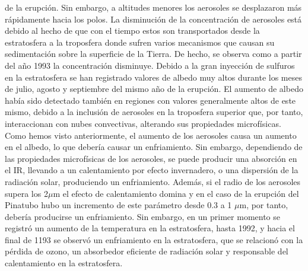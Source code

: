 \documentclass[a4apaper,twocolumn,10pt]{article}
\begin{document}
de la erupci\'on. Sin embargo, a altitudes menores los aerosoles se desplazaron m\'as r\'apidamente hacia los polos. La disminuci\'on de la concentraci\'on de aerosoles est\'a debido al hecho de que con el tiempo estos son transportados desde la estratosfera a la troposfera donde sufren varios mecanismos que causan su sedimentaci\'on sobre la superficie de la Tierra. De hecho, se observa como a partir del a\~no 1993 la concentraci\'on disminuye. Debido a la gran inyecci\'on de sulfuros en la estratosfera se han registrado valores de albedo muy altos durante los meses de julio, agosto y septiembre del mismo a\~no de la erupci\'on.
El aumento de albedo hab\'ia sido detectado tambi\'en en regiones con valores generalmente altos de este mismo, debido a la inclusi\'on de aerosoles en la troposfera superior que, por tanto, interaccionan con nubes convectivas, alterando sus propiedades microf\'isicas. Como hemos visto
anteriormente, el aumento de los aerosoles causa un aumento en el albedo, lo que deber\'ia causar un enfriamiento. Sin embargo, dependiendo de las propiedades microf\'isicas de los aerosoles, se puede producir una absorción en el IR, llevando a un calentamiento por efecto invernadero, o una dispersi\'on de la radiaci\'on solar, produciendo un enfriamiento. Adem\'as, si el
radio de los aerosoles supera los 2$\mu$m el efecto de calentamiento domina y en el caso de la erupci\'on del Pinatubo hubo un incremento de este par\'ametro desde 0.3 a 1 $\mu$m, por tanto, deber\'ia producirse un enfriamiento. Sin embargo, en un primer momento se registr\'o un aumento de la temperatura en la estratosfera, hasta 1992, y hacia el final de 1193 se observ\'o
un enfriamiento en la estratosfera, que se relacion\'o con la p\'erdida de ozono, un absorbedor eficiente de radiaci\'on solar y responsable del calentamiento en la estratosfera.
\end{document}
